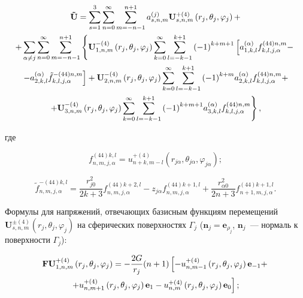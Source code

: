 \begin{russian}
\begin{multline}
{\bf{\tilde U}} = \sum\limits_{s = 1}^3 {\sum\limits_{n = 0}^\infty  {\sum\limits_{m =  - n - 1}^{n + 1} {a_{s,n,m}^{(j)}} } } {\bf{U}}_{s,n,m}^{ +(4)}\left( {{r_j},{\theta _j},{\varphi _j}} \right) + \\
+ \sum\limits_{\alpha  \ne j} {\sum\limits_{n = 0}^\infty  {\sum\limits_{m =  - n - 1}^{n + 1} {\left\{ {{\bf{U}}_{1,n,m}^{ - (4)}\left( {{r_j},{\theta _j},{\varphi _j}} \right)\sum\limits_{k = 0}^\infty  {\mathop \sum \limits_{l =  - k - 1}^{k + 1} {{( - 1)}^{k + m + 1}}\left[ {a_{1,k,l}^{(\alpha )}f_{k,l,j,\alpha }^{(44)n,m} - } \right.} } \right.} } } \\
\left. { - a_{2,k,l}^{(\alpha )}\tilde f_{k,l,j,\alpha }^{ - (44)n,m}} \right] + {\bf{U}}_{2,n,m}^{ - (4)}\left( {{r_j},{\theta _j},{\varphi _j}} \right)\sum\limits_{k = 0}^\infty  {\sum\limits_{l =  - k - 1}^{k + 1} {{{( - 1)}^{k + m}}} } a_{2,k,l}^{(\alpha )}f_{k,l,j,\alpha }^{(44)n,m} + \\
\left. { + {\bf{U}}_{3,n,m}^{ - (4)}\left( {{r_j},{\theta _j},{\varphi _j}} \right)\sum\limits_{k = 0}^\infty  {\sum\limits_{l =  - k - 1}^{k + 1} {{{( - 1)}^{k + m + 1}}} } a_{3,k,l}^{(\alpha )}f_{k,l,j,\alpha }^{(44)n,m}} \right\},
\label{eq:8:10}
\end{multline}

\noindent где

\begin{equation}
f_{n,m,j,\alpha }^{(44)k,l} = u_{n + k,m - l}^{ + (4)}\left( {{r_{j\alpha }},{\theta _{j\alpha }},{\varphi _{j\alpha }}} \right);
\end{equation}

\begin{equation}
\tilde f_{n,m,j,\alpha }^{ - (44)k,l} = \frac{{r_{j0}^2}}{{2k + 3}}f_{n,m,j,\alpha }^{(44)k + 2,l} - {z_{j\alpha }}f_{n,m,j,\alpha }^{(44)k + 1,l} + \frac{{r_{\alpha 0}^2}}{{2n + 3}}f_{n + 1,m,j,\alpha }^{(44)k + 1,l}.
\end{equation}

Формулы для напряжений, отвечающих базисным функциям перемещений $\mathbf{U}_{s,n,m}^{\pm(4)}(r_j,\theta_j,\varphi_j)$ на сферических поверхностях $\Gamma_j$ ($\mathbf{n}_j=\mathbf{e}_{\rho_j}$, $\mathbf{n}_j$~--- нормаль к поверхности $\Gamma_j$):

\begin{multline}
{\bf{FU}}_{1,n,m}^{ + (4)}\left( {{r_j},{\theta _j},{\varphi _j}} \right) =  - \frac{{2G}}{{{r_j}}}(n + 1)\left[ { - u_{n,m - 1}^{ + (4)}\left( {{r_j},{\theta _j},{\varphi _j}} \right){{\bf{e}}_{ - 1}} + } \right.\\
\left. { + u_{n,m + 1}^{ + (4)}\left( {{r_j},{\theta _j},{\varphi _j}} \right){{\bf{e}}_1} - u_{n,m}^{ + (4)}\left( {{r_j},{\theta _j},{\varphi _j}} \right){{\bf{e}}_0}} \right];
\label{eq:8:f1}
\end{multline}


\end{russian}

